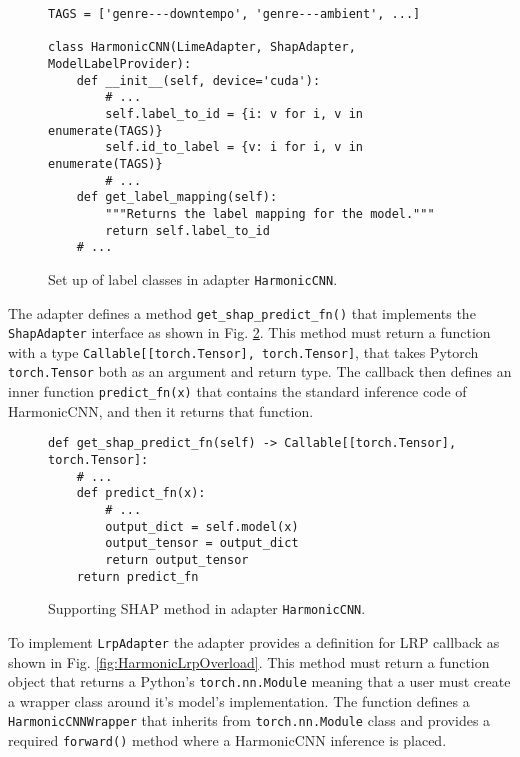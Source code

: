 \documentclass[
    bindingoffset=5mm,  %
    footnoteindent=3mm, %
    hyphenation=true    %
]{src/wut-thesis}
\begin{document}
\begin{figure}[h!]
\begin{verbatim}
TAGS = ['genre---downtempo', 'genre---ambient', ...]

class HarmonicCNN(LimeAdapter, ShapAdapter, ModelLabelProvider):
    def __init__(self, device='cuda'):
        # ...
        self.label_to_id = {i: v for i, v in enumerate(TAGS)}
        self.id_to_label = {v: i for i, v in enumerate(TAGS)}
        # ...
    def get_label_mapping(self):
        """Returns the label mapping for the model."""
        return self.label_to_id
    # ...
\end{verbatim}
\caption{Set up of label classes in adapter \texttt{HarmonicCNN}.}
\label{fig:HarmonicLabelMapping}
\end{figure}

The adapter defines a method \texttt{get_shap_predict_fn()} that implements
the \texttt{ShapAdapter} interface as shown in Fig. \ref{fig:HarmonicShapOverload}.
This method must return a function with a type \texttt{Callable[[torch.Tensor], torch.Tensor]}, %
that takes Pytorch \texttt{torch.Tensor} both as an argument and return type.
The callback then defines an inner function \texttt{predict_fn(x)} that contains
the standard inference code of HarmonicCNN, and then it returns that function.

\begin{figure}%
\begin{verbatim}
def get_shap_predict_fn(self) -> Callable[[torch.Tensor], torch.Tensor]:
    # ...
    def predict_fn(x):
        # ... 
        output_dict = self.model(x)
        output_tensor = output_dict
        return output_tensor
    return predict_fn
\end{verbatim}
\caption{Supporting SHAP method in adapter \texttt{HarmonicCNN}.}
\label{fig:HarmonicShapOverload}
\end{figure}

To implement \texttt{LrpAdapter} the adapter provides a definition for LRP
callback as shown in Fig. \ref{fig:HarmonicLrpOverload}. This method must return
a function object that returns a Python's \texttt{torch.nn.Module} meaning
that a user must create a wrapper class around it's model's implementation.
The function defines a \texttt{HarmonicCNNWrapper} that inherits from 
\texttt{torch.nn.Module} class and provides a required
\texttt{forward()} method where a HarmonicCNN inference is placed.
\end{document}
